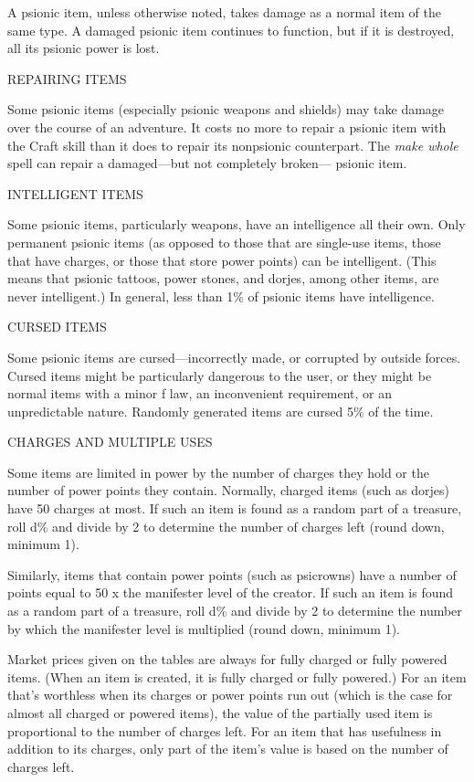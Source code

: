 \documentclass{article}
\begin{document}
A psionic item, unless otherwise noted, takes damage as a normal item of the same 
type. A damaged psionic item continues to function, but if it is destroyed, all 
its psionic power is lost.

\vspace{12pt}
REPAIRING ITEMS

Some psionic items (especially psionic weapons and shields) may take damage over 
the course of an adventure. It costs no more to repair a psionic item with the 
Craft skill than it does to repair its nonpsionic counterpart. The \textit{make 
whole }spell can repair a damaged---but not completely broken--- psionic item.

\vspace{12pt}
INTELLIGENT ITEMS

Some psionic items, particularly weapons, have an intelligence all their own. Only 
permanent psionic items (as opposed to those that are single-use items, those that 
have charges, or those that store power points) can be intelligent. (This means 
that psionic tattoos, power stones, and dorjes, among other items, are never intelligent.) 
In general, less than 1\% of psionic items have intelligence. 

\vspace{12pt}
CURSED ITEMS

Some psionic items are cursed---incorrectly made, or corrupted by outside forces. 
Cursed items might be particularly dangerous to the user, or they might be normal 
items with a minor f law, an inconvenient requirement, or an unpredictable nature. 
Randomly generated items are cursed 5\% of the time.

\vspace{12pt}
CHARGES AND MULTIPLE USES

Some items are limited in power by the number of charges they hold or the number 
of power points they contain. Normally, charged items (such as dorjes) have 50 
charges at most. If such an item is found as a random part of a treasure, roll 
d\% and divide by 2 to determine the number of charges left (round down, minimum 
1).

Similarly, items that contain power points (such as psicrowns) have a number of 
points equal to 50 x the manifester level of the creator. If such an item is found 
as a random part of a treasure, roll d\% and divide by 2 to determine the number 
by which the manifester level is multiplied (round down, minimum 1).

Market prices given on the tables are always for fully charged or fully powered 
items. (When an item is created, it is fully charged or fully powered.) For an 
item that's worthless when its charges or power points run out (which is the case 
for almost all charged or powered items), the value of the partially used item 
is proportional to the number of charges left. For an item that has usefulness 
in addition to its charges, only part of the item's value is based on the number 
of charges left.
\end{document}
